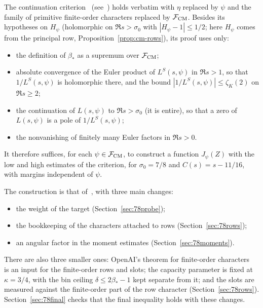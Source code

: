 \documentclass[11pt]{article}
\numberwithin{equation}{section}
\begin{document}
The continuation criterion~\cite[Prop.~2.1]{OAI78}
(see~\cite[Proposition~1]{G78}) holds verbatim with $\eta$ replaced by $\psi$ and the family of primitive
finite-order characters replaced by $\mathcal F_{\rm CM}$. Besides its hypotheses on $H_\psi$ (holomorphic on
$\Re s>\sigma_0$ with $|H_\psi-1|\le1/2$; here $H_\psi$ comes from the principal row,
Proposition~\ref{prop:cm-rows}), its proof uses only:
\begin{itemize}
\item the definition of $\beta_*$ as a supremum over $\mathcal F_{\rm CM}$;
\item absolute convergence of the Euler product of $L^S(s,\psi)$ in $\Re s>1$, so that $1/L^S(s,\psi)$ is
 holomorphic there, and the bound $|1/L^S(s,\psi)|\le\zeta_K(2)$ on $\Re s\ge2$;
\item the continuation of $L(s,\psi)$ to $\Re s>\sigma_0$ (it is entire), so that a zero of $L(s,\psi)$ is a
 pole of $1/L^S(s,\psi)$;
\item the nonvanishing of finitely many Euler factors in $\Re s>0$.
\end{itemize}
It therefore suffices, for each $\psi\in\mathcal F_{\rm CM}$, to construct a function
$J_\psi(Z)$ with the low and high estimates of the criterion, for $\sigma_0=7/8$ and
$C(s)=s-11/16$, with margins independent of $\psi$.

The construction is that of~\cite{OAI78}, with three main changes:
\begin{itemize}
\item the weight of the target (Section~\ref{sec:78probe});
\item the bookkeeping of the characters attached to rows
 (Section~\ref{sec:78rows});
\item an angular factor in the moment estimates
 (Section~\ref{sec:78moments}).
\end{itemize}
There are also three smaller ones: OpenAI's theorem for finite-order characters~\cite[Theorem~1.1]{OAI78}
is an input for the finite-order rows and slots; the capacity parameter is fixed at $\kappa=3/4$, with the bin
ceiling $\delta\le2\beta_*-1$ kept separate from it; and the slots are measured against the finite-order part of
the row character (Section~\ref{sec:78rows}). Section~\ref{sec:78final} checks that the final inequality holds
with these changes.
\end{document}
